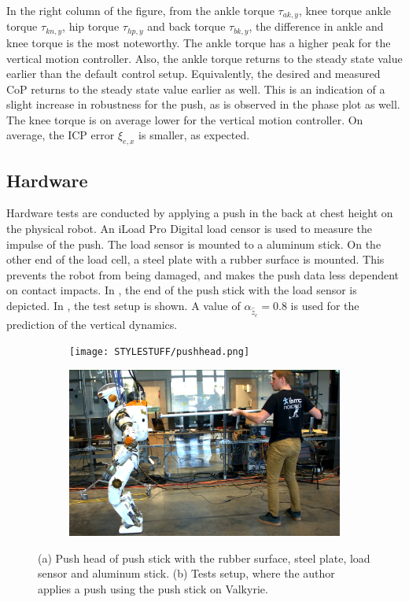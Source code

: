 In the right column of the figure, from the ankle torque $\tau_{ak,y}$, knee torque ankle torque $\tau_{kn,y}$, hip torque $\tau_{hp,y}$ and back torque $\tau_{bk,y}$, the difference in ankle and knee torque is the most noteworthy. The ankle torque has a higher peak for the vertical motion controller. Also, the ankle torque returns to the steady state value earlier than the default control setup. Equivalently, the desired and measured \ac{CoP} returns to the steady state value earlier as well. This is an indication of a slight increase in robustness for the push, as is observed in the phase plot as well. The knee torque is on average lower for the vertical motion controller. On average, the \ac{ICP} error $\xi_{e,x}$ is smaller, as expected.

\subsection{Hardware} 
Hardware tests are conducted by applying a push in the back at chest height on the physical robot. An iLoad Pro Digital load censor \cite{iload} is used to measure the impulse of the push. The load sensor is mounted to a aluminum stick. On the other end of the load cell, a steel plate with a rubber surface is mounted. This prevents the robot from being damaged, and makes the push data less dependent on contact impacts. In , the end of the push stick with the load sensor is depicted. In , the test setup is shown. A value of $\alpha_{\hat{\ddot{z}}_{c}}=0.8$ is used for the prediction of the vertical dynamics. 
\begin{figure}
\centering
  \begin{subfigure}{0.495\textwidth}
  \centering
  \texttt{[image: STYLESTUFF/pushhead.png]}
   \caption{}
    \label{fig:pushhead}
  \end{subfigure}
  \begin{subfigure}{0.495\textwidth}
    \centering
  \includegraphics[width=.94\linewidth]{STYLESTUFF/authorpush.png}
  \caption{}
   \label{fig:authorpush}
  \end{subfigure}
  \caption{(a) Push head of push stick with the rubber surface, steel plate, load sensor and aluminum stick. (b) Tests setup, where the author applies a push using the push stick on Valkyrie.}
  \label{fig:pushsetup}
\end{figure}

